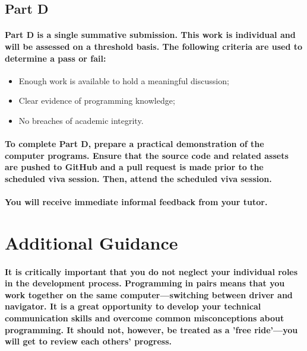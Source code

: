 \documentclass{../../fal_assignment}
\begin{document}
\subsection*{Part D}

\paragraph{Part D is a \textbf{single summative submission}. This work is \textbf{individual} and will be assessed on a \textbf{threshold} basis.  The following criteria are used to determine a pass or fail:}

\begin{itemize}
	\item Enough work is available to hold a meaningful discussion;
	\item Clear evidence of programming knowledge;
	\item No breaches of academic integrity.
\end{itemize}

\paragraph{To complete Part D, prepare a practical demonstration of the computer programs. Ensure that the source code and related assets are pushed to GitHub and a pull request is made prior to the scheduled viva session. Then, attend the scheduled viva session.}

\paragraph{You will receive immediate \textbf{informal feedback} from your \textbf{tutor}.}

\section*{Additional Guidance}

\paragraph{It is critically important that you do not neglect your individual roles in the development process. Programming in pairs means that you work together on the same computer---switching between driver and navigator. It is a great opportunity to develop your technical communication skills and overcome common misconceptions about programming. It should not, however, be treated as a 'free ride'---you will get to review each others' progress.}
\end{document}
